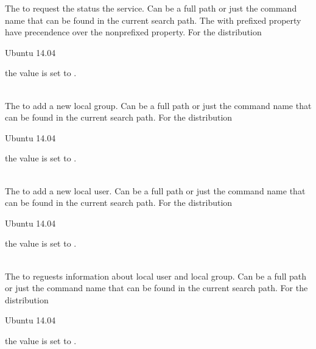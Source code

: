 The  to request the status the service. Can be a full path or
just the command name that can be found in the current search path. 
The with  prefixed property have precendence over the 
nonprefixed property.
For the distribution
\begin{inparaitem}
\item[\TheDistribution{ubuntu}] Ubuntu 14.04
\end{inparaitem}
the value is set to .

\\

The  to add a new local group. Can be a full path or
just the command name that can be found in the current search path. 
For the distribution
\begin{inparaitem}
\item[\TheDistribution{ubuntu}] Ubuntu 14.04
\end{inparaitem}
the value is set to .

\\

The  to add a new local user. Can be a full path or
just the command name that can be found in the current search path. 
For the distribution
\begin{inparaitem}
\item[\TheDistribution{ubuntu}] Ubuntu 14.04
\end{inparaitem}
the value is set to .

\\

The  to reguests information about local user and local group. Can 
be a full path or just the command name that can be found in the current search path. 
For the distribution
\begin{inparaitem}
\item[\TheDistribution{ubuntu}] Ubuntu 14.04
\end{inparaitem}
the value is set to .


